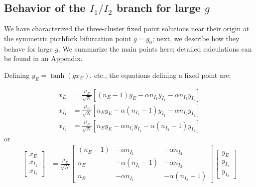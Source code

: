 \documentclass[11pt,reqno]{amsart}
\begin{document}
\subsection{Behavior of the $I_1/I_2$ branch for large $g$} \label{sec:stab_largeg}
We have characterized the three-cluster fixed point solutions near their origin at the symmetric picthfork bifurcation point $g=g_0$; next, we describe how they behave for large $g$. We summarize the main points here; detailed calculations can be found in an Appendix.

Defining $y_E = \tanh(gx_E)$, etc., the equations defining a fixed point are:

 \begin{align*}
        x_E &= \frac{\mu_E}{\sqrt{N}} \left[ (n_E - 1)y_E - \alpha n_{I_1} y_{I_1} - \alpha n_{I_2} y_{I_2} \right] \\
        x_{I_1} &= \frac{\mu_E}{\sqrt{N}} \left[ n_E y_E - \alpha (n_{I_1}-1) y_{I_1} - \alpha n_{I_2} y_{I_2} \right] \\
        x_{I_2} &= \frac{\mu_E}{\sqrt{N}} \left[ n_E y_E - \alpha n_{I_1} y_{I_1} - \alpha (n_{I_2}-1) y_{I_2} \right] 
    \end{align*}
or
\begin{align}
 \begin{bmatrix} x_E\\x_{I_1}\\x_{I_2}\end{bmatrix} 
 &= \frac{\mu_E}{\sqrt{N}} 
 \begin{bmatrix} (n_E - 1) & -\alpha n_{I_1} & - \alpha n_{I_2}  \\
 n_E  & -\alpha (n_{I_1}-1) & - \alpha n_{I_2}  \\
 n_E  & -\alpha n_{I_1} & - \alpha (n_{I_2}-1)  
 \end{bmatrix}
 \begin{bmatrix} y_E\\y_{I_1}\\y_{I_2}\end{bmatrix} 
 \label{eq:3cluster_solution}
 \end{align}
\end{document}
